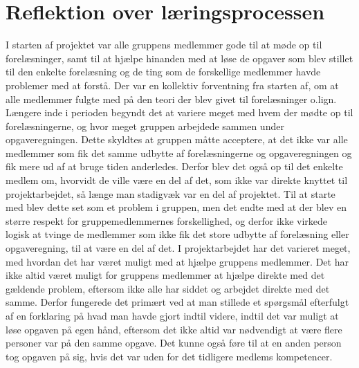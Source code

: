 \section{Reflektion over læringsprocessen}\label{Reflektion-over-laeringsprocessen}
I starten af projektet var alle gruppens medlemmer gode til at møde op til forelæsninger, samt til at hjælpe hinanden med at løse de opgaver som blev stillet til den enkelte forelæsning og de ting som de forskellige medlemmer havde problemer med at forstå. Der var en kollektiv forventning fra starten af, om at alle medlemmer fulgte med på den teori der blev givet til forelæsninger o.lign. Længere inde i perioden begyndt det at variere meget med hvem der mødte op til forelæsningerne, og hvor meget gruppen arbejdede sammen under opgaveregningen. Dette skyldtes at gruppen måtte acceptere, at det ikke var alle medlemmer som fik det samme udbytte af forelæsningerne og opgaveregningen og fik mere ud af at bruge tiden anderledes. Derfor blev det også op til det enkelte medlem om, hvorvidt de ville være en del af det, som ikke var direkte knyttet til projektarbejdet, så længe man stadigvæk var en del af projektet. Til at starte med blev dette set som et problem i gruppen, men det endte med at der blev en større respekt for gruppemedlemmernes forskellighed, og derfor ikke virkede logisk at tvinge de medlemmer som ikke fik det store udbytte af forelæsning eller opgaveregning, til at være en del af det.
	I projektarbejdet har det varieret meget, med hvordan det har været muligt med at hjælpe gruppens medlemmer. Det har ikke altid været muligt for gruppens medlemmer at hjælpe direkte med det gældende problem, eftersom ikke alle har siddet og arbejdet direkte med det samme. Derfor fungerede det primært ved at man stillede et spørgsmål efterfulgt af en forklaring på hvad man havde gjort indtil videre, indtil det var muligt at løse opgaven på egen hånd, eftersom det ikke altid var nødvendigt at være flere personer var på den samme opgave. Det kunne også føre til at en anden person tog opgaven på sig, hvis det var uden for det tidligere medlems kompetencer.